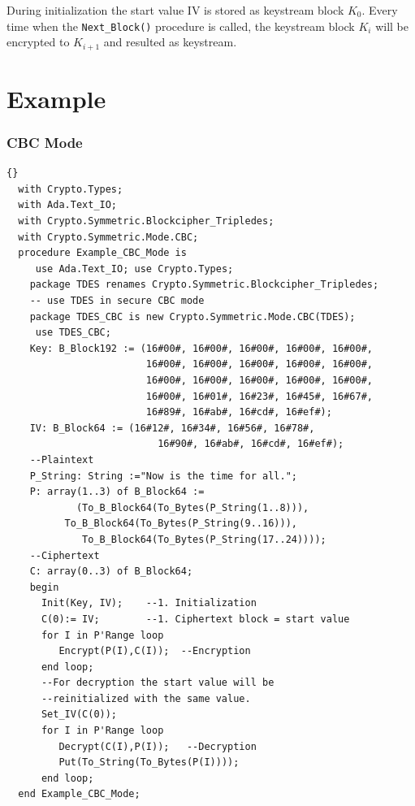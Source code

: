 During initialization the start value IV is stored as keystream block
$K_0$. Every time when the \texttt{Next\_Block()} procedure is called,
the keystream block $K_i$ will be encrypted to $K_{i+1}$ and resulted
as keystream.


\section{Example}
\subsubsection*{CBC Mode}
\begin{lstlisting}{}
  with Crypto.Types;
  with Ada.Text_IO;
  with Crypto.Symmetric.Blockcipher_Tripledes;
  with Crypto.Symmetric.Mode.CBC;
  procedure Example_CBC_Mode is
	 use Ada.Text_IO; use Crypto.Types;
    package TDES renames Crypto.Symmetric.Blockcipher_Tripledes;
    -- use TDES in secure CBC mode
    package TDES_CBC is new Crypto.Symmetric.Mode.CBC(TDES);
	 use TDES_CBC;
    Key: B_Block192 := (16#00#, 16#00#, 16#00#, 16#00#, 16#00#,
                        16#00#, 16#00#, 16#00#, 16#00#, 16#00#,
                        16#00#, 16#00#, 16#00#, 16#00#, 16#00#,
                        16#00#, 16#01#, 16#23#, 16#45#, 16#67#,
                        16#89#, 16#ab#, 16#cd#, 16#ef#);
    IV: B_Block64 := (16#12#, 16#34#, 16#56#, 16#78#,
            	          16#90#, 16#ab#, 16#cd#, 16#ef#);
    --Plaintext
    P_String: String :="Now is the time for all.";
    P: array(1..3) of B_Block64 :=
			(To_B_Block64(To_Bytes(P_String(1..8))),
          To_B_Block64(To_Bytes(P_String(9..16))),
			 To_B_Block64(To_Bytes(P_String(17..24))));
    --Ciphertext
    C: array(0..3) of B_Block64;
    begin
      Init(Key, IV);    --1. Initialization
      C(0):= IV;        --1. Ciphertext block = start value
      for I in P'Range loop
	     Encrypt(P(I),C(I));  --Encryption
      end loop;
      --For decryption the start value will be
      --reinitialized with the same value.
      Set_IV(C(0));
      for I in P'Range loop
         Decrypt(C(I),P(I));   --Decryption
         Put(To_String(To_Bytes(P(I))));
      end loop;
  end Example_CBC_Mode;
\end{lstlisting}

